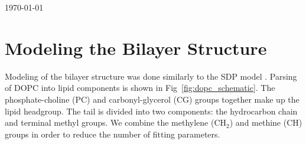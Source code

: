 \documentclass[12pt,letterpaper]{article}
\begin{document}
\today

\section{Modeling the Bilayer Structure}
Modeling of the bilayer structure was done similarly to the SDP model 
\cite{ref:Kucerka08}. Parsing of DOPC into lipid components is shown in
Fig~\ref{fig:dopc_schematic}. The phosphate-choline (PC) and 
carbonyl-glycerol (CG) groups together make up the lipid headgroup. The tail
is divided into two components: the hydrocarbon chain and terminal methyl 
groups. We combine the methylene ($\textrm{CH}_2$) and methine (CH) groups 
in order to reduce
the number of fitting parameters.
\end{document}
